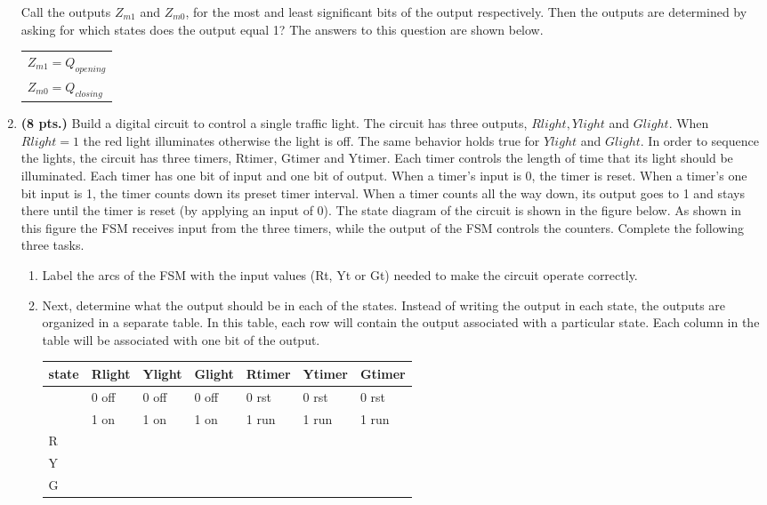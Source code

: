 \begin{enumerate}
\begin{onlysolution}
{Call the outputs $Z_{m1}$ and $Z_{m0}$, for the most and least
significant bits of the output respectively.  Then the outputs
are determined by asking for which states does the output
equal 1?  The answers to this question are shown below.

\begin{tabular}{l}
$Z_{m1} = Q_{opening}$ \\
$Z_{m0} = Q_{closing}$ \\
\end{tabular}

}\end{onlysolution} 


\item \textbf{ (8 pts.)}
Build a digital circuit to control a single traffic light.  The circuit
has three outputs, $Rlight, Ylight$ and $ Glight$.  When
$Rlight=1$ the red light illuminates otherwise the light is off.
The same behavior holds true for $Ylight$ and $Glight$.  In order
to sequence the lights, the circuit has three timers, Rtimer, Gtimer and 
Ytimer.  Each timer controls the length of time that its light should be 
illuminated.  Each timer has one bit of input and one bit of output.  When a 
timer's input is 0, the timer is reset.  When a timer's one bit
input is 1, the timer 
counts down its preset timer interval.  When a timer counts all the way down,
its output goes to 1 and stays there until the timer is reset (by applying
an input of 0).  The state diagram of the circuit is shown in the
figure below.  As shown in this figure the FSM receives input from the 
three timers, while the output of the FSM controls the counters. Complete
the following three tasks.


\begin{enumerate}
\item Label the arcs of the FSM with the input values (Rt, Yt or Gt)
needed to make the circuit operate correctly.  

\item Next, determine what the output should be in each
of the states.  Instead of writing the output in each state, the
outputs are organized in a separate table.  In this table, each
row will contain the output associated with a particular state.
Each column in the table will be associated with one bit of the output.

\begin{tabular}{l||l|l|l|l|l|l}
state	& Rlight & Ylight & Glight & Rtimer & Ytimer & Gtimer	\\ \hline 
	& 0 off  & 0 off  & 0 off  & 0 rst  & 0 rst  & 0 rst	\\ \hline
	& 1 on   & 1 on   & 1 on   & 1 run  & 1 run  & 1 run	\\ \hline \hline
R	&	 &	  &	   &	    &	     &		\\ \hline
Y	&	 &	  &	   &	    &	     &		\\ \hline
G	&	 &	  &	   &	    &	     &		\\ 
\end{tabular}


\end{enumerate}
\end{enumerate}
